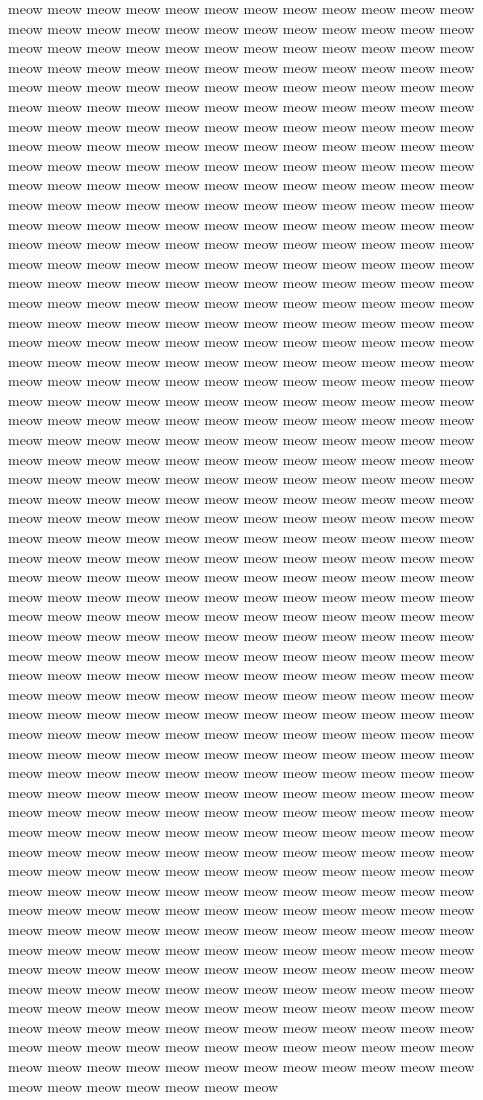 meow meow meow meow meow meow meow meow meow meow meow meow meow meow meow meow meow meow meow meow meow meow meow meow meow meow meow meow meow meow meow meow meow meow meow meow meow meow meow meow meow meow meow meow meow meow meow meow meow meow meow meow meow meow meow meow meow meow meow meow meow meow meow meow meow meow meow meow meow meow meow meow meow meow meow meow meow meow meow meow meow meow meow meow meow meow meow meow meow meow meow meow meow meow meow meow meow meow meow meow meow meow meow meow meow meow meow meow meow meow meow meow meow meow meow meow meow meow meow meow meow meow meow meow meow meow meow meow meow meow meow meow meow meow meow meow meow meow meow meow meow meow meow meow meow meow meow meow meow meow meow meow meow meow meow meow meow meow meow meow meow meow meow meow meow meow meow meow meow meow meow meow meow meow meow meow meow meow meow meow meow meow meow meow meow meow meow meow meow meow meow meow meow meow meow meow meow meow meow meow meow meow meow meow meow meow meow meow meow meow meow meow meow meow meow meow meow meow meow meow meow meow meow meow meow meow meow meow meow meow meow meow meow meow meow meow meow meow meow meow meow meow meow meow meow meow meow meow meow meow meow meow meow meow meow meow meow meow meow meow meow meow meow meow meow meow meow meow meow meow meow meow meow meow meow meow meow meow meow meow meow meow meow meow meow meow meow meow meow meow meow meow meow meow meow meow meow meow meow meow meow meow meow meow meow meow meow meow meow meow meow meow meow meow meow meow meow meow meow meow meow meow meow meow meow meow meow meow meow meow meow meow meow meow meow meow meow meow meow meow meow meow meow meow meow meow meow meow meow meow meow meow meow meow meow meow meow meow meow meow meow meow meow meow meow meow meow meow meow meow meow meow meow meow meow meow meow meow meow meow meow meow meow meow meow meow meow meow meow meow meow meow meow meow meow meow meow meow meow meow meow meow meow meow meow meow meow meow meow meow meow meow meow meow meow meow meow meow meow meow meow meow meow meow meow meow meow meow meow meow meow meow meow meow meow meow meow meow meow meow meow meow meow meow meow meow meow meow meow meow meow meow meow meow meow meow meow meow meow meow meow meow meow meow meow meow meow meow meow meow meow meow meow meow meow meow meow meow meow meow meow meow meow meow meow meow meow meow meow meow meow meow meow meow meow meow meow meow meow meow meow meow meow meow meow meow meow meow meow meow meow meow meow meow meow meow meow meow meow meow meow meow meow meow meow meow meow meow meow meow meow meow meow meow meow meow meow meow meow meow meow meow meow meow meow meow meow meow meow meow meow meow meow meow meow meow meow meow meow meow meow meow meow meow meow meow meow meow meow meow meow meow meow meow meow meow meow meow meow meow meow meow meow meow meow meow meow meow meow meow meow meow meow meow meow meow meow meow meow meow meow meow meow meow meow meow meow meow meow meow meow meow meow meow meow meow meow meow meow meow meow meow meow meow meow meow meow meow meow meow meow meow meow meow meow meow meow meow meow meow meow meow meow meow meow meow meow meow meow meow meow meow meow meow meow meow meow meow meow meow meow meow meow meow meow meow meow 